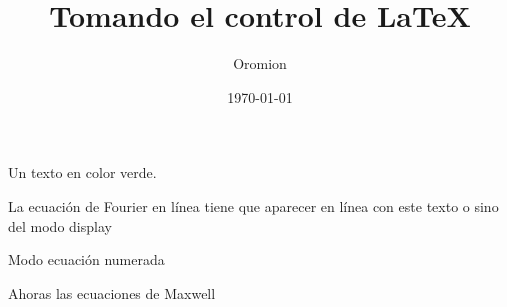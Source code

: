 \documentclass{article}
\title{Tomando el control de \LaTeX{}}
\author{Oromion}
\date{\today}
\begin{document}
\maketitle

\textcolor{myGreen}{Un texto en color verde.}

La ecuación de Fourier en línea \Fourier[inLine] tiene que aparecer en línea con este texto o sino del modo display \Fourier[disp]

Modo ecuación numerada \Fourier[eq]

\cuadratica{}

\Fourier[eq]

Ahoras las ecuaciones de Maxwell

\textcolor{myBlue}{\Maxwell{}}
\end{document}
